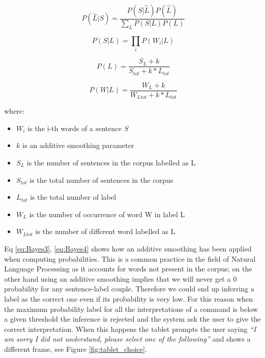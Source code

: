 \begin{equation} 
 P(\hat{L}|S)= \frac{P(S|\hat{L})P(\hat{L})}{\sum_L{P(S|L)P(L)}}
 \label{eq:Bayes1}
\end{equation}

\begin{equation}
 P(S|L) = \prod_i{P(W_i|L)}
 \label{eq:Bayes2}
\end{equation}

\begin{equation}
 P(L) = \frac{S_L + k}{S_{tot} + k* L_{tot}}
 \label{eq:Bayes3}
\end{equation}

\begin{equation}
 P(W|L) = \frac{W_L + k}{W_{Ltot} +k* L_{tot}}
 \label{eq:Bayes4}
\end{equation}

\noindent where:
\begin{itemize}
  \item[] $W_i$ is the i-th words of a sentence $S$
  \item[] $k$ is an additive smoothing parameter
  \item[] $S_L$ is the number of sentences in the corpus labelled as L
  \item[] $S_{tot}$ is the total number of sentences in the corpus
  \item[] $L_{tot}$ is the total number of label
  \item[] $W_L$ is the number of occurrence of word W in label L
  \item[] $W_{Ltot}$ is the number of different word labelled as L
\end{itemize}

Eq \ref{eq:Bayes3}, \ref{eq:Bayes4} shows how an additive smoothing has been applied when computing probabilities. This is a common practice in the field of Natural Language Processing as it accounts for words not present in the corpus; on the other hand using an additive smoothing implies that we will never get a 0 probability for any sentence-label couple. Therefore we could end up inferring a label as the correct one even if its probability is very low. For this reason when the maximum probability label for all the interpretations of a command is below a given threshold the inference is rejected and the system ask the user to give the correct interpretation. When this happens the tablet prompts the user saying \emph{``I am sorry I did not understand, please select one of the following''} and shows a different frame, see Figure \ref{fig:tablet_choice}.

